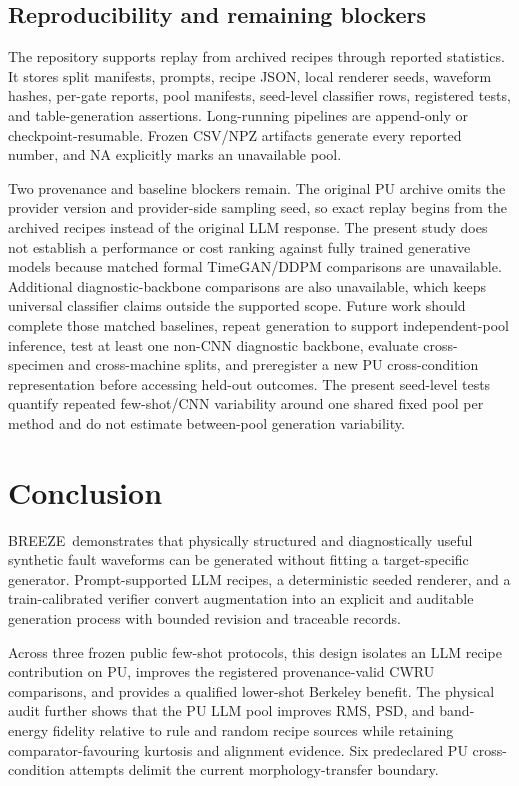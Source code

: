 \documentclass[a4paper,fleqn]{cas-sc}
\newcommand{\breeze}{BREEZE}
\begin{document}
\subsection{Reproducibility and remaining blockers}

The repository supports replay from archived recipes through reported
statistics. It stores split manifests, prompts, recipe JSON, local renderer
seeds, waveform hashes, per-gate reports, pool manifests, seed-level classifier
rows, registered tests, and table-generation assertions. Long-running
pipelines are append-only or checkpoint-resumable. Frozen CSV/NPZ artifacts
generate every reported number, and NA explicitly marks an unavailable pool.

Two provenance and baseline blockers remain. The original PU archive omits the
provider version and provider-side sampling seed, so exact replay begins from
the archived recipes instead of the original LLM response. The present study
does not establish a performance or cost ranking against fully trained
generative models because matched formal TimeGAN/DDPM comparisons are
unavailable. Additional diagnostic-backbone comparisons are also unavailable,
which keeps universal classifier claims outside the supported scope. Future
work should complete those matched baselines, repeat generation to support
independent-pool inference, test at least one non-CNN diagnostic backbone,
evaluate cross-specimen and cross-machine splits, and preregister a new PU
cross-condition representation before accessing held-out outcomes. The present
seed-level tests quantify repeated few-shot/CNN variability around one shared
fixed pool per method and do not estimate between-pool generation variability.

\section{Conclusion}
\label{sec:conclusion}

\breeze\ demonstrates that physically structured and diagnostically useful
synthetic fault waveforms can be generated without fitting a target-specific
generator. Prompt-supported LLM recipes, a deterministic seeded renderer, and
a train-calibrated verifier convert augmentation into an explicit and auditable
generation process with bounded revision and traceable records.

Across three frozen public few-shot protocols, this design isolates an LLM
recipe contribution on PU, improves the registered provenance-valid CWRU
comparisons, and provides a qualified lower-shot Berkeley benefit. The physical
audit further shows that the PU LLM pool improves RMS, PSD, and band-energy
fidelity relative to rule and random recipe sources while retaining
comparator-favouring kurtosis and alignment evidence. Six predeclared PU
cross-condition attempts delimit the current morphology-transfer boundary.
\end{document}
